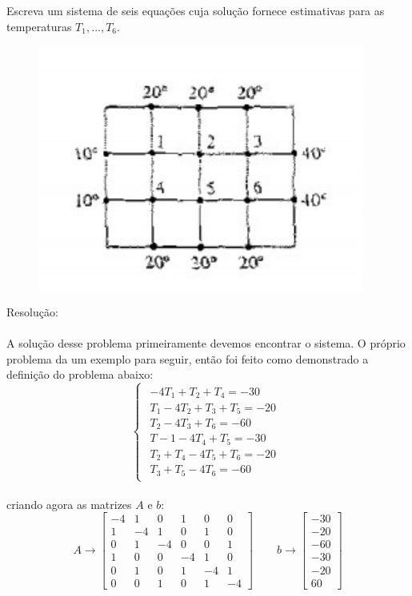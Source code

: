 \documentclass[
12pt,				%
openright,			%
twoside,			%
a4paper,			%
english,			%
french,				%
spanish,			%
brazil				%
]{abntex2_new}
\begin{document}
		Escreva um sistema de seis equações cuja solução fornece estimativas para as
		temperaturas $T_1,...,T_6$.\\
		\begin{figure}[htb]
			\centering
			
			\includegraphics[scale=0.7]{figura1.png}
			
		\end{figure}
		
		Resolução:\\
		\\
		A solução desse problema primeiramente devemos encontrar o sistema. O próprio
		problema
		da um exemplo para seguir, então foi feito como demonstrado a definição do
		problema abaixo:\\
		$$\begin{cases}
		\begin{aligned}
		-4T_1+T_2+T_4=-30\\
		T_1-4T_2+T_3+T_5=-20\\
		T_2-4T_3+T_6=-60\\
		T-1-4T_4+T_5=-30\\
		T_2+T_4-4T_5+T_6=-20\\
		T_3+T_5-4T_6=-60
		\end{aligned}
		\end{cases}$$\\
		criando agora as matrizes $A$ e $b$:\\
		$$	A \rightarrow   \begin{bmatrix}
		-4 & 1 & 0 & 1 & 0 & 0 \\
		1 & -4 & 1 & 0 & 1 & 0 \\
		0 & 1 & -4 & 0 & 0 & 1 \\
		1 & 0 & 0 & -4 & 1 & 0 \\
		0 & 1 & 0 & 1 & -4 & 1 \\
		0 & 0 & 1 & 0 & 1 & -4 
		\end{bmatrix} \hspace{25pt}
		b \rightarrow  \begin{bmatrix}
		-30\\
		-20\\
		-60\\
		-30\\
		-20\\
		60
		\end{bmatrix}
		$$\\
		
\end{document}

